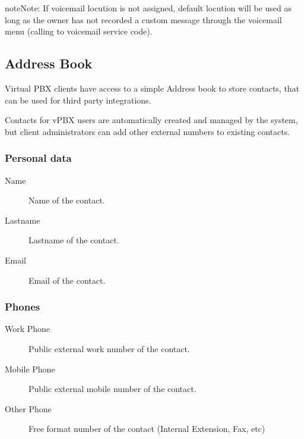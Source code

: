 \documentclass[letterpaper,10pt,english]{sphinxmanual}
\begin{document}
\begin{notice}{note}{Note:}
If voicemail locution is not assigned, default locution will be used as long as
the owner has not recorded a custom message through the voicemail menu (calling to
voicemail service code).
\end{notice}


\subsection{Address Book}
\label{administration_portal/client/vpbx/addressbook:address-book}\label{administration_portal/client/vpbx/addressbook::doc}
Virtual PBX clients have access to a simple Address book to store contacts,
that can be used for third party integrations.

Contacts for vPBX users are automatically created and managed by the system,
but client administrators can add other external numbers to existing contacts.


\subsubsection{Personal data}
\label{administration_portal/client/vpbx/addressbook:personal-data}\begin{description}
\item[{Name}] \leavevmode{}\label{administration_portal/client/vpbx/addressbook:term-name}
Name of the contact.

\item[{Lastname}] \leavevmode{}\label{administration_portal/client/vpbx/addressbook:term-lastname}
Lastname of the contact.

\item[{Email}] \leavevmode{}\label{administration_portal/client/vpbx/addressbook:term-email}
Email of the contact.

\end{description}


\subsubsection{Phones}
\label{administration_portal/client/vpbx/addressbook:phones}\begin{description}
\item[{Work Phone}] \leavevmode{}\label{administration_portal/client/vpbx/addressbook:term-work-phone}
Public external work number of the contact.

\item[{Mobile Phone}] \leavevmode{}\label{administration_portal/client/vpbx/addressbook:term-mobile-phone}
Public external mobile number of the contact.

\item[{Other Phone}] \leavevmode{}\label{administration_portal/client/vpbx/addressbook:term-other-phone}
Free format number of the contact (Internal Extension, Fax, etc)

\end{description}
\end{document}

